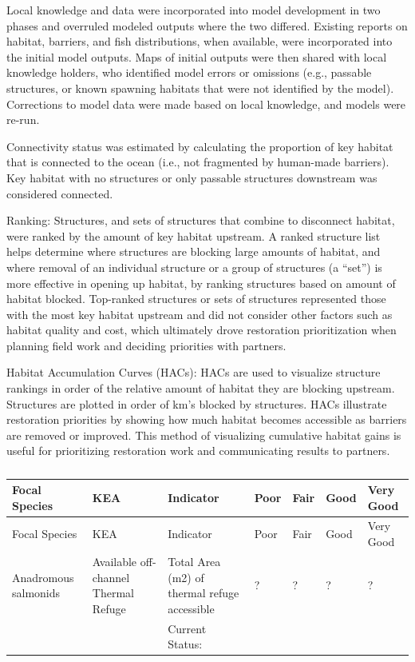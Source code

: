 \documentclass[
  letterpaper,
  DIV=11,
  numbers=noendperiod]{scrreprt}
\begin{document}
Local knowledge and data were incorporated into model development in two
phases and overruled modeled outputs where the two differed. Existing
reports on habitat, barriers, and fish distributions, when available,
were incorporated into the initial model outputs. Maps of initial
outputs were then shared with local knowledge holders, who identified
model errors or omissions (e.g., passable structures, or known spawning
habitats that were not identified by the model). Corrections to model
data were made based on local knowledge, and models were re-run.

Connectivity status was estimated by calculating the proportion of key
habitat that is connected to the ocean (i.e., not fragmented by
human-made barriers). Key habitat with no structures or only passable
structures downstream was considered connected.

Ranking: Structures, and sets of structures that combine to disconnect
habitat, were ranked by the amount of key habitat upstream. A ranked
structure list helps determine where structures are blocking large
amounts of habitat, and where removal of an individual structure or a
group of structures (a ``set'') is more effective in opening up habitat,
by ranking structures based on amount of habitat blocked. Top-ranked
structures or sets of structures represented those with the most key
habitat upstream and did not consider other factors such as habitat
quality and cost, which ultimately drove restoration prioritization when
planning field work and deciding priorities with partners.

Habitat Accumulation Curves (HACs): HACs are used to visualize structure
rankings in order of the relative amount of habitat they are blocking
upstream. Structures are plotted in order of km's blocked by structures.
HACs illustrate restoration priorities by showing how much habitat
becomes accessible as barriers are removed or improved. This method of
visualizing cumulative habitat gains is useful for prioritizing
restoration work and communicating results to partners.

\begin{longtable}[]{@{}lllllll@{}}
\caption{}\label{T_7db65}\tabularnewline
\toprule\noalign{}
Focal Species & KEA & Indicator & Poor & Fair & Good & Very Good \\
\midrule\noalign{}
\endfirsthead
\toprule\noalign{}
Focal Species & KEA & Indicator & Poor & Fair & Good & Very Good \\
\midrule\noalign{}
\endhead
\bottomrule\noalign{}
\endlastfoot
Anadromous salmonids & Available off-channel Thermal Refuge & Total Area
(m2) of thermal refuge accessible & ? & ? & ? & ? \\
& & Current Status: & & & & \\
\end{longtable}
\end{document}
